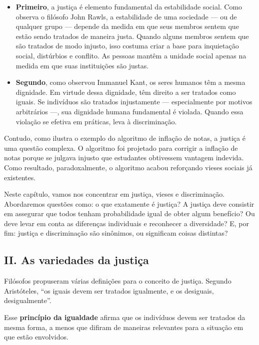 \documentclass[
  11pt,
]{article}
\begin{document}
\begin{itemize}
\item
  \textbf{Primeiro}, a justiça é elemento fundamental da estabilidade
  social. Como observa o filósofo John Rawls, a estabilidade de uma
  sociedade --- ou de qualquer grupo --- depende da medida em que seus
  membros sentem que estão sendo tratados de maneira justa. Quando
  alguns membros sentem que são tratados de modo injusto, isso costuma
  criar a base para inquietação social, distúrbios e conflito. As
  pessoas mantêm a unidade social apenas na medida em que suas
  instituições são justas.
\item
  \textbf{Segundo}, como observou Immanuel Kant, os seres humanos têm a
  mesma dignidade. Em virtude dessa dignidade, têm direito a ser
  tratados como iguais. Se indivíduos são tratados injustamente ---
  especialmente por motivos arbitrários ---, sua dignidade humana
  fundamental é violada. Quando essa violação se efetiva em práticas,
  leva à discriminação.
\end{itemize}

Contudo, como ilustra o exemplo do algoritmo de inflação de notas, a
justiça é uma questão complexa. O algoritmo foi projetado para corrigir
a inflação de notas porque se julgava injusto que estudantes obtivessem
vantagem indevida. Como resultado, paradoxalmente, o algoritmo acabou
reforçando vieses sociais já existentes.

Neste capítulo, vamos nos concentrar em justiça, vieses e discriminação.
Abordaremos questões como: o que exatamente é justiça? A justiça deve
consistir em assegurar que todos tenham probabilidade igual de obter
algum benefício? Ou deve levar em conta as diferenças individuais e
reconhecer a diversidade? E, por fim: justiça e discriminação são
sinônimos, ou significam coisas distintas?

\subsection{II. As variedades da
justiça}\label{ii.-as-variedades-da-justiuxe7a}

Filósofos propuseram várias definições para o conceito de justiça.
Segundo Aristóteles, ``os iguais devem ser tratados igualmente, e os
desiguais, desigualmente''.

Esse \textbf{princípio da igualdade} afirma que os indivíduos devem ser
tratados da mesma forma, a menos que difiram de maneiras relevantes para
a situação em que estão envolvidos.
\end{document}
